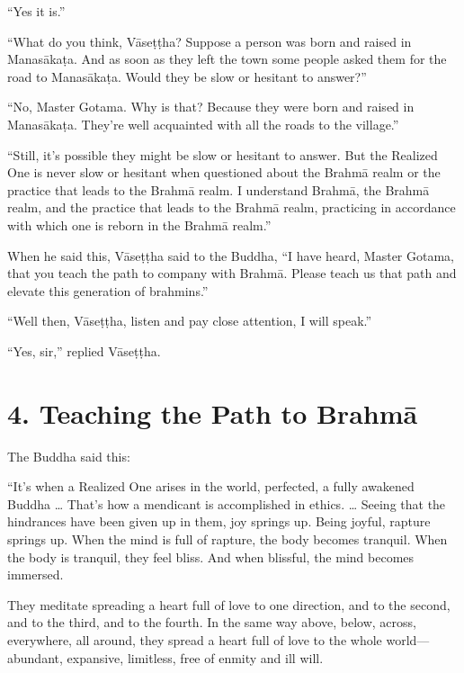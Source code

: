 \documentclass[12pt,openany]{book}%
\begin{document}
“Yes it is.” 

“What do you think, \textsanskrit{Vāseṭṭha}? Suppose a person was born and raised in \textsanskrit{Manasākaṭa}. And as soon as they left the town some people asked them for the road to \textsanskrit{Manasākaṭa}. Would they be slow or hesitant to answer?” 

“No, Master Gotama. Why is that? Because they were born and raised in \textsanskrit{Manasākaṭa}. They’re well acquainted with all the roads to the village.” 

“Still, it’s possible they might be slow or hesitant to answer. But the Realized One is never slow or hesitant when questioned about the \textsanskrit{Brahmā} realm or the practice that leads to the \textsanskrit{Brahmā} realm. I understand \textsanskrit{Brahmā}, the \textsanskrit{Brahmā} realm, and the practice that leads to the \textsanskrit{Brahmā} realm, practicing in accordance with which one is reborn in the \textsanskrit{Brahmā} realm.” 

When he said this, \textsanskrit{Vāseṭṭha} said to the Buddha, “I have heard, Master Gotama, that you teach the path to company with \textsanskrit{Brahmā}. Please teach us that path and elevate this generation of brahmins.” 

“Well then, \textsanskrit{Vāseṭṭha}, listen and pay close attention, I will speak.” 

“Yes, sir,” replied \textsanskrit{Vāseṭṭha}. 

\section*{4. Teaching the Path to \textsanskrit{Brahmā} }

The Buddha said this: 

“It’s when a Realized One arises in the world, perfected, a fully awakened Buddha … That’s how a mendicant is accomplished in ethics. … Seeing that the hindrances have been given up in them, joy springs up. Being joyful, rapture springs up. When the mind is full of rapture, the body becomes tranquil. When the body is tranquil, they feel bliss. And when blissful, the mind becomes immersed. 

They meditate spreading a heart full of love to one direction, and to the second, and to the third, and to the fourth. In the same way above, below, across, everywhere, all around, they spread a heart full of love to the whole world—abundant, expansive, limitless, free of enmity and ill will. 
\end{document}
